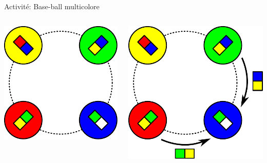 \begin{frame}{Activité: Base-ball multicolore}
  \begin{columns}
    \begin{column}{0.27\linewidth}
    \includegraphics[width=\linewidth]{img/baseball_init.pdf}\\
    \end{column}
    \begin{column}{0.27\linewidth}
    \includegraphics[width=\linewidth]{img/baseball_coup.pdf}\\

\end{column}
\end{columns}
\end{frame}
